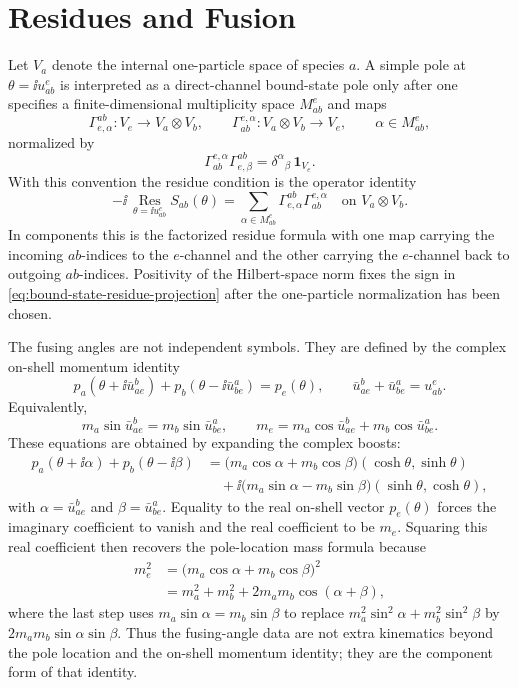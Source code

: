 \section{Residues and Fusion}

Let \(V_a\) denote the internal one-particle space of species \(a\).  A
simple pole at \(\theta=\ii u_{ab}^{e}\) is interpreted as a direct-channel
bound-state pole only after one specifies a finite-dimensional multiplicity
space \(M_{ab}^{e}\) and maps
\[
  \Gamma_{e,\alpha}^{ab}\colon V_e\longrightarrow V_a\otimes V_b,
  \qquad
  \Gamma_{ab}^{e,\alpha}\colon V_a\otimes V_b\longrightarrow V_e,
  \qquad \alpha\in M_{ab}^{e},
\]
normalized by
\[
  \Gamma_{ab}^{e,\alpha}\Gamma_{e,\beta}^{ab}
  =
  \delta^\alpha{}_\beta\,\mathbf 1_{V_e}.
\]
With this convention the residue condition is the operator identity
\begin{equation}
  -\ii\,\operatorname*{Res}_{\theta=\ii u_{ab}^{e}}S_{ab}(\theta)
  =
  \sum_{\alpha\in M_{ab}^{e}}
  \Gamma_{e,\alpha}^{ab}\Gamma_{ab}^{e,\alpha}
  \quad
  \text{on }V_a\otimes V_b .
  \label{eq:bound-state-residue-projection}
\end{equation}
In components this is the factorized residue formula with one map carrying
the incoming \(ab\)-indices to the \(e\)-channel and the other carrying the
\(e\)-channel back to outgoing \(ab\)-indices.  Positivity of the
Hilbert-space norm fixes the sign in
\eqref{eq:bound-state-residue-projection} after the one-particle
normalization has been chosen.

The fusing angles are not independent symbols.  They are defined by the
complex on-shell momentum identity
\[
  p_a(\theta+\ii\bar u_{ae}^{b})
  +
  p_b(\theta-\ii\bar u_{be}^{a})
  =
  p_e(\theta),
  \qquad
  \bar u_{ae}^{b}+\bar u_{be}^{a}=u_{ab}^{e}.
\]
Equivalently,
\[
  m_a\sin \bar u_{ae}^{b}=m_b\sin \bar u_{be}^{a},
  \qquad
  m_e=m_a\cos \bar u_{ae}^{b}+m_b\cos \bar u_{be}^{a}.
\]
These equations are obtained by expanding the complex boosts:
\[
\begin{aligned}
  p_a(\theta+\ii\alpha)+p_b(\theta-\ii\beta)
  &=
  \bigl(m_a\cos\alpha+m_b\cos\beta\bigr)
  (\cosh\theta,\sinh\theta) \\
  &\quad
  +\ii\bigl(m_a\sin\alpha-m_b\sin\beta\bigr)
  (\sinh\theta,\cosh\theta),
\end{aligned}
\]
with \(\alpha=\bar u_{ae}^{b}\) and \(\beta=\bar u_{be}^{a}\).  Equality to the
real on-shell vector \(p_e(\theta)\) forces the imaginary coefficient to vanish
and the real coefficient to be \(m_e\).  Squaring this real coefficient then
recovers the pole-location mass formula because
\[
\begin{aligned}
  m_e^2
  &=
  \bigl(m_a\cos\alpha+m_b\cos\beta\bigr)^2 \\
  &=
  m_a^2+m_b^2+2m_am_b\cos(\alpha+\beta),
\end{aligned}
\]
where the last step uses
\(m_a\sin\alpha=m_b\sin\beta\) to replace
\(m_a^2\sin^2\alpha+m_b^2\sin^2\beta\) by
\(2m_am_b\sin\alpha\sin\beta\).  Thus the fusing-angle data are not extra
kinematics beyond the pole location and the on-shell momentum identity; they
are the component form of that identity.

